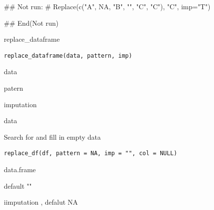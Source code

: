 \documentclass[a4paper]{book}
\begin{document}
%
\begin{Examples}
\begin{ExampleCode}

## Not run: 
# Replace(c("A", NA, "B", "", "C", "C"), "C", imp="T")

## End(Not run)

\end{ExampleCode}
\end{Examples}
%
\begin{Description}
replace\_dataframe
\end{Description}
%
\begin{Usage}
\begin{verbatim}
replace_dataframe(data, pattern, imp)
\end{verbatim}
\end{Usage}
%
\begin{Arguments}
\begin{ldescription}
\item[\code{data}] data

\item[\code{pattern}] patern

\item[\code{imp}] imputation
\end{ldescription}
\end{Arguments}
%
\begin{Value}
data
\end{Value}
%
\begin{Description}
Search for and fill in empty data
\end{Description}
%
\begin{Usage}
\begin{verbatim}
replace_df(df, pattern = NA, imp = "", col = NULL)
\end{verbatim}
\end{Usage}
%
\begin{Arguments}
\begin{ldescription}
\item[\code{df}] data.frame

\item[\code{pattern}] default ""

\item[\code{imp}] iimputation , defalut NA
\end{ldescription}
\end{Arguments}
\end{document}
